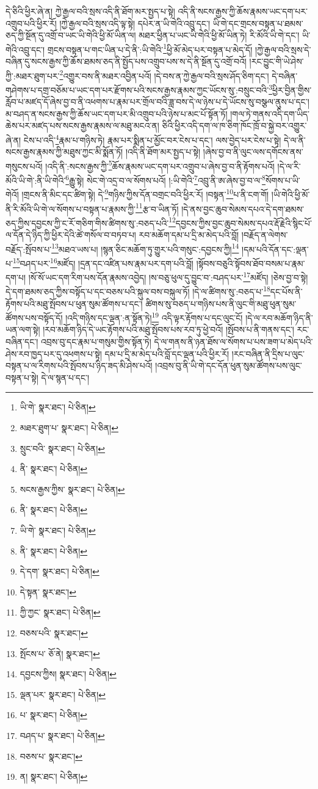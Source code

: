 དེ་ཅིའི་ཕྱིར་ཞེ་ན། ཀྱེ་རྒྱལ་བའི་སྲས་འདི་ནི་ཐོག་མར་སྤྱད་པ་སྟེ། འདི་ནི་སངས་རྒྱས་ཀྱི་ཆོས་རྣམས་ཡང་དག་པར་འགྲུབ་པའི་ཕྱིར་རོ། །ཀྱེ་རྒྱལ་བའི་སྲས་འདི་ལྟ་སྟེ། དཔེར་ན་ཡི་གེའི་འབྲུ་དང་། ཡི་གེ་དང་གྲངས་བསྟན་པ་ཐམས་ཅད་ཀྱི་སྔོན་དུ་འགྲོ་བ་ཡང་ཡི་གེའི་ཕྱི་མོ་ཡིན་ལ། མཐར་ཕྱིན་པ་ཡང་ཡི་གེའི་ཕྱི་མོ་ཡིན་ཏེ། རི་མོའི་ཡི་གེ་དང་། ཡི་གེའི་འབྲུ་དང་། གྲངས་བསྟན་པ་གང་ཡིན་པ་དེ་ནི་:ཡི་གེའི་\footnote{ཡི་གེ་  སྣར་ཐང་།  པེ་ཅིན། }ཕྱི་མོ་མེད་པར་བསྟན་པ་མེད་དོ། །ཀྱེ་རྒྱལ་བའི་སྲས་དེ་བཞིན་དུ་སངས་རྒྱས་ཀྱི་ཆོས་ཐམས་ཅད་ནི་སྤྱོད་པས་འགྲུབ་པས་ས་དེ་ནི་སྔོན་དུ་འགྲོ་བའོ། །རང་བྱུང་གི་ཡེ་ཤེས་ཀྱི་:མཐར་ཐུག་པར་\footnote{མཐར་ཐུག་པ་  སྣར་ཐང་།  པེ་ཅིན། }འགྱུར་བས་ནི་མཐར་འབྱིན་པའོ། །དེ་བས་ན་ཀྱེ་རྒྱལ་བའི་སྲས་ཤོད་ཅིག་དང་། དེ་བཞིན་གཤེགས་པ་དགྲ་བཅོམ་པ་ཡང་དག་པར་རྫོགས་པའི་སངས་རྒྱས་རྣམས་ཀྱང་ཡོངས་སུ་:བསྲུང་བའི་\footnote{སྲུང་བའི་  སྣར་ཐང་།  པེ་ཅིན། }ཕྱིར་བྱིན་གྱིས་རློབ་པ་མཛད་དོ་ཞེས་བྱ་བ་ནི་འཕགས་པ་རྣམ་པར་གྲོལ་བའི་ཟླ་བས་དེ་ལ་ཉེས་པ་དེ་ཡོངས་སུ་བསྩལ་ནུས་པ་དང་། མ་བཤད་ན་སངས་རྒྱས་ཀྱི་ཆོས་ཡང་དག་པར་མི་འགྲུབ་པའི་ཉེས་པ་མང་པོ་སྟོན་ཏོ། །གལ་ཏེ་གནས་འདི་དག་ཡིད་ཆེས་པར་མཛད་པས་སངས་རྒྱས་རྣམས་ལ་མཐུ་མངའ་ན། ཅིའི་ཕྱིར་འདི་དག་ལ་ཁ་ཅིག་ཁོང་ཁྲོ་བ་སྐྱེ་བར་འགྱུར་ཞེ་ན། ངེས་པ་འདི་\footnote{ནི་  སྣར་ཐང་།  པེ་ཅིན། }རྣམ་པ་གཉིས་ཏེ། རྣམ་པར་སྨིན་པ་མྱོང་བར་ངེས་པ་དང་། ལས་བྱེད་པར་ངེས་པ་སྟེ། དེ་ལ་ནི་སངས་རྒྱས་རྣམས་ཀྱི་མཐུས་ཀྱང་མི་སྨོན་ཏོ། །འདི་ནི་ཐོག་མར་སྤྱད་པ་སྟེ། །ཞེས་བྱ་བ་ནི་ལུང་ལས་དགོངས་ནས་གསུངས་པའོ། །འདི་ནི་:སངས་རྒྱས་ཀྱི་\footnote{སངས་རྒྱས་ཀྱིས་  སྣར་ཐང་།  པེ་ཅིན། }ཆོས་རྣམས་ཡང་དག་པར་འགྲུབ་པ་ཞེས་བྱ་བ་ནི་རྟོགས་པའོ། །དེ་ལ་རི་མོའི་ཡི་གེ་:ནི་ཡི་གེའི་\footnote{ནི་  སྣར་ཐང་།  པེ་ཅིན། }རྒྱུ་སྟེ། སེང་གེ་འདྲ་བ་ལ་སོགས་པའོ། །:ཡི་གེའི་\footnote{ཡི་གེ་  སྣར་ཐང་།  པེ་ཅིན། }འབྲུ་ནི་ཨ་ཞེས་བྱ་བ་ལ་\footnote{ནི་  སྣར་ཐང་།  པེ་ཅིན། }སོགས་པ་ཡི་གེའོ། །གྲངས་ནི་མིང་དང་ཚིག་སྟེ། དེ་\footnote{དེ་དག་  སྣར་ཐང་།  པེ་ཅིན། }གཉིས་ཀྱིས་དོན་བགྲང་བའི་ཕྱིར་རོ། །བསྟན་\footnote{དེ་སྟན་  སྣར་ཐང་། }པ་ནི་ངག་གོ། །ཡི་གེའི་ཕྱི་མོ་ནི་རི་མོའི་ཡི་གེ་ལ་སོགས་པ་བསྟན་པ་རྣམས་ཀྱི་\footnote{ཀྱི་ཀྱང་  སྣར་ཐང་།  པེ་ཅིན། }རྩ་བ་ཡིན་ཏོ། །དེ་ནས་བྱང་ཆུབ་སེམས་དཔའ་དེ་དག་ཐམས་ཅད་ཀྱིས་དབྱངས་ཀྱི་ང་རོ་གཅིག་གིས་ཚིགས་སུ་:བཅད་པའི་\footnote{བཅས་པའི་  སྣར་ཐང་། }དབྱངས་ཀྱིས་བྱང་ཆུབ་སེམས་དཔའ་རྡོ་རྗེའི་སྙིང་པོ་ལ་དོན་དེ་ཉིད་ཀྱི་ཕྱིར་དེའི་ཚེ་གསོལ་བ་བཏབ་པ། རབ་མཆོག་དམ་པ་དྲི་མ་མེད་པའི་བློ། །བརྗོད་ན་ལེགས་བརྗོད་:སྤོབས་པ་\footnote{སྤོངས་པ་  ཅོ་ནེ།  སྣར་ཐང་། }མཐའ་ཡས་པ། །སྙན་ཅིང་མཆོག་ཏུ་གྱུར་པའི་གསུང་:དབྱངས་ཀྱི།\footnote{དབྱངས་ཀྱིས།  སྣར་ཐང་།  པེ་ཅིན། } །དམ་པའི་དོན་དང་:ལྡན་པ་\footnote{ལྡན་པར་  སྣར་ཐང་།  པེ་ཅིན། }བཤད་པར་\footnote{པ་  སྣར་ཐང་།  པེ་ཅིན། }མཛོད། །དྲན་དང་འཛིན་པས་རྣམ་པར་དག་པའི་བློ། །སྟོབས་བཅུའི་སྟོབས་ཐོབ་བསམ་པ་རྣམ་དག་པ། །སོ་སོ་ཡང་དག་རིག་པས་དོན་རྣམས་འབྱེད། །ས་བཅུ་ཕུལ་དུ་བྱུང་བ་:བཤད་པར་\footnote{བཤད་པ་  སྣར་ཐང་།  པེ་ཅིན། }མཛོད། །ཅེས་བྱ་བ་སྟེ། དེ་དག་ཐམས་ཅད་ཀྱིས་བསྟོད་པ་དང་བཅས་པའི་སྐུལ་བས་བསྐུལ་ཏོ། །དེ་ལ་ཚིགས་སུ་:བཅད་པ་\footnote{བཅས་པ་  སྣར་ཐང་། }དང་པོས་ནི་རྟོགས་པའི་མཐུ་སྤོབས་པ་ཕུན་སུམ་ཚོགས་པ་དང་། ཚིགས་སུ་བཅད་པ་གཉིས་པས་ནི་ལུང་གི་མཐུ་ཕུན་སུམ་ཚོགས་པས་བསྟོད་དོ། །འདི་གཉིས་དང་ལྡན་:ན་སྟོན་ཏེ།\footnote{ན།  སྣར་ཐང་།  པེ་ཅིན། } འདི་ལྟར་རྟོགས་པ་དང་ལུང་ངོ། །དེ་ལ་རབ་མཆོག་ཉིད་ནི་ཡན་ལག་སྟེ། །རབ་མཆོག་ཉིད་དེ་ཡང་རྟོགས་པའི་མཐུ་སྤོབས་པས་རབ་ཏུ་ཕྱེ་བའོ། །སྤོབས་པ་ནི་གནས་དང་། རང་བཞིན་དང་། འབྲས་བུ་དང་རྣམ་པ་གསུམ་གྱིས་སྟོན་ཏེ། དེ་ལ་གནས་ནི་ཉན་ཐོས་ལ་སོགས་པ་པས་ཟག་པ་མེད་པའི་ཤེས་རབ་ཁྱད་པར་དུ་འཕགས་པ་སྟེ། དམ་པ་དྲི་མ་མེད་པའི་བློ་དང་ལྡན་པའི་ཕྱིར་རོ། །རང་བཞིན་ནི་དྲིས་པ་ལུང་བསྟན་པ་ལ་རིགས་པའི་སྤོབས་པ་ཉིད་ཟད་མི་ཤེས་པའོ། །འབྲས་བུ་ནི་ཡི་གེ་དང་དོན་ཕུན་སུམ་ཚོགས་པས་ལུང་བསྟན་པ་སྟེ། དེ་ལ་སྙན་པ་དང་། 